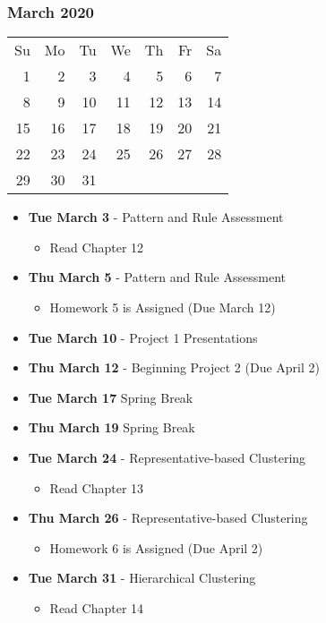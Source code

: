 \subsubsection*{March 2020}
\begin{tabular}{rrrrrrr}
Su & Mo & Tu & We & Th & Fr & Sa\\
 1 &  2 &  3 &  4 &  5 &  6 &  7\\ \cline{3-3}
 8 &  9 & \multicolumn{1}{|r|}{10} & 11 & 12 & 13 & 14\\ \cline{3-3}
15 & 16 & 17 & 18 & 19 & 20 & 21\\ 
22 & 23 & 24 & 25 & 26 & 27 & 28\\
29 & 30 & 31 &    &    &    & \\
\end{tabular}
\begin{itemize}
\item\textbf{Tue March  3} - Pattern and Rule Assessment
    \begin{itemize}
        \item Read Chapter 12
    \end{itemize}
\item\textbf{Thu March  5} - Pattern and Rule Assessment
    \begin{itemize}
        \item Homework 5 is Assigned (Due March 12)
    \end{itemize}
\item\textbf{Tue March 10} - Project 1 Presentations
\item\textbf{Thu March 12} - Beginning Project 2 (Due April 2)
\item\textbf{Tue March 17} Spring Break
\item\textbf{Thu March 19} Spring Break
\item\textbf{Tue March 24} - Representative-based Clustering
    \begin{itemize}
        \item Read Chapter 13
    \end{itemize}
\item\textbf{Thu March 26} - Representative-based Clustering
    \begin{itemize}
        \item Homework 6 is Assigned (Due April 2)
    \end{itemize}
\item\textbf{Tue March 31} - Hierarchical Clustering
    \begin{itemize}
        \item Read Chapter 14
    \end{itemize}
\end{itemize}
\hrulefill

